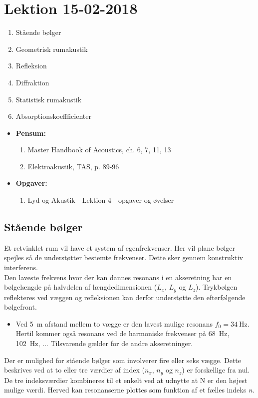 \section{Lektion 15-02-2018}

\begin{enumerate}
	\item Stående bølger
	\item Geometrisk rumakustik
	\item Refleksion
	\item Diffraktion
	\item Statistisk rumakustik
	\item Absorptionskoeffficienter
\end{enumerate}

\begin{mdframed}[style=exampledefault]
	\begin{itemize}
		\item \textbf{Pensum:} 
		\begin{enumerate}
			\item Master Handbook of Acoustics, ch. 6, 7, 11, 13
			\item Elektroakustik, TAS,  p. 89-96
		\end{enumerate}
		\item \textbf{Opgaver:} 
		\begin{enumerate}
			\item Lyd og Akustik - Lektion 4 - opgaver og øvelser
		\end{enumerate}
	\end{itemize}
\end{mdframed}

\subsection{Stående bølger}
Et retvinklet rum vil have et system af egenfrekvenser. Her vil plane bølger spejles så de understøtter bestemte frekvenser. Dette sker gennem konstruktiv interferens. \\

Den laveste frekvens hvor der kan dannes resonans i en akseretning har en bølgelængde på halvdelen af længdedimensionen ($L_x$, $L_y$ og $L_z$). Trykbølgen reflekteres ved væggen og refleksionen kan derfor understøtte den efterfølgende bølgefront.
\begin{itemize}
	\item Ved \SI{5}{\meter} afstand mellem to vægge er den lavest mulige resonans $f_0 = \SI{34}{\hertz}$. Hertil kommer også resonans ved de harmoniske frekvenser på \SI{68}{\hertz}, \SI{102}{\hertz}, ... Tilsvarende gælder for de andre akseretninger.
\end{itemize}
Der er mulighed for stående bølger som involverer fire eller seks vægge.
Dette beskrives ved at to eller tre værdier af index ($n_x$, $n_y$ og $n_z$) er forskellige fra nul. 
De tre indeksværdier kombineres til et enkelt ved at udnytte at N er den højest mulige værdi. Herved kan resonanserne plottes som
funktion af et fælles indeks \textit{n}.\\


